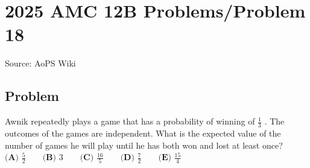 \documentclass[12pt]{article}
\begin{document}
\section*{{2025 AMC 12B Problems/Problem 18}}
Source: AoPS Wiki

\subsection*{Problem}
Awnik repeatedly plays a game that has a probability of winning of $\frac{1}{3}$ . The outcomes of the games are independent. What is the expected value of the number of games he will play until he has both won and lost at least once? $\textbf{(A) } \frac{5}{2} \qquad \textbf{(B) } 3 \qquad \textbf{(C) } \frac{16}{5} \qquad \textbf{(D) } \frac{7}{2} \qquad \textbf{(E) } \frac{15}{4}$
\end{document}
